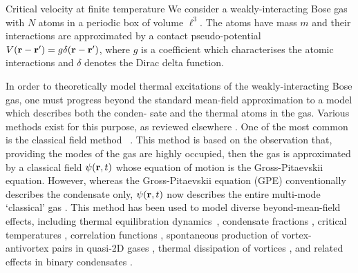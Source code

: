\begin{chapter}{\label{cha:nonequib}Critical velocity at finite temperature}
We consider a weakly-interacting Bose gas with $N$ atoms in a periodic box of volume $\ell^3$.  The atoms have mass $m$ and their interactions are approximated by a contact pseudo-potential $V({\bf r}-{\bf r'})= g \delta({\bf r}-{\bf r'})$, where $g$ is a coefficient which characterises the atomic interactions and $\delta$ denotes the Dirac delta function. 

In order to theoretically model thermal excitations of the weakly-interacting Bose gas, one must progress beyond the standard mean-field approximation to a model which describes both the conden-
sate and the thermal atoms in the gas.  Various methods exist for this purpose, as reviewed elsewhere \cite{Pol_Rev,Proukakis,finite_temp_book,Blakie,berloff_2014}.  One of the most common is the classical field method ~\cite{Svis5,Davis,PRL.87.210404, PhysRevA.66.013603,Davis2,PhysRevLett.95.263901,Pol_Rev}.  This method is based on the observation that, providing the modes of the gas are highly occupied, then the gas is approximated by a classical field $\psi({\bf r},t)$ whose equation of motion is the Gross-Pitaevskii equation.  However, whereas the Gross-Pitaevskii equation (GPE) conventionally describes the condensate only, $\psi({\bf r},t)$ now describes the entire multi-mode `classical' gas \cite{Proukakis,Blakie}.   This method has been used to model diverse beyond-mean-field effects, including thermal equilibration dynamics~\cite{PhysRevA.66.013603,PhysRevLett.95.263901,pattinson_2014,nazarenko_2014}, condensate fractions \cite{Davis}, critical temperatures \cite{Davis2006}, correlation functions \cite{Wright2011}, spontaneous production of vortex-antivortex pairs in quasi-2D gases \cite{Simula}, thermal dissipation of vortices \cite{berloff_2007},  and related effects in binary condensates \cite{Berloff_2006,Salman20091482,pattinson_2014}.   



\end{chapter}
